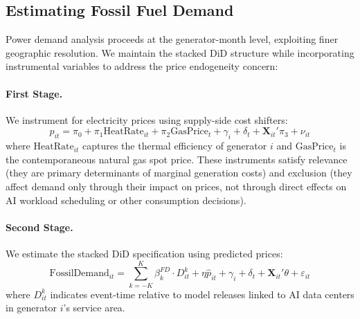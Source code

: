 \documentclass[a4paper,fleqn,longmktitle]{cas-sc}
\newcommand{\nb}[1]{\textcolor{blue}{NB[#1]}}
\begin{document}

\subsection{Estimating Fossil Fuel Demand}

Power demand analysis proceeds at the generator-month level, exploiting finer geographic resolution. We maintain the stacked DiD structure while incorporating instrumental variables to address the price endogeneity concern:

\paragraph{First Stage.} We instrument for electricity prices using supply-side cost shifters:
\begin{equation}
p_{it} = \pi_0 + \pi_1 \text{HeatRate}_{it} + \pi_2 \text{GasPrice}_{t} + \gamma_i + \delta_t + \mathbf{X}_{it}'\pi_3 + \nu_{it}
\label{eq:firststage}
\end{equation}
where $\text{HeatRate}_{it}$ captures the thermal efficiency of generator $i$ and $\text{GasPrice}_t$ is the contemporaneous natural gas spot price. These instruments satisfy relevance (they are primary determinants of marginal generation costs) and exclusion (they affect demand only through their impact on prices, not through direct effects on AI workload scheduling or other consumption decisions).

\paragraph{Second Stage.} We estimate the stacked DiD specification using predicted prices:
\begin{equation}
\text{FossilDemand}_{it} = \sum_{k=-K}^{K} \beta_k^{FD} \cdot D_{it}^k + \eta \hat{p}_{it} + \gamma_i + \delta_t + \mathbf{X}_{it}'\theta + \varepsilon_{it}
\label{eq:demand_eventstudy}
\end{equation}
where $D_{it}^k$ indicates event-time relative to model releases linked to AI data centers in generator $i$'s service area.
\end{document}
